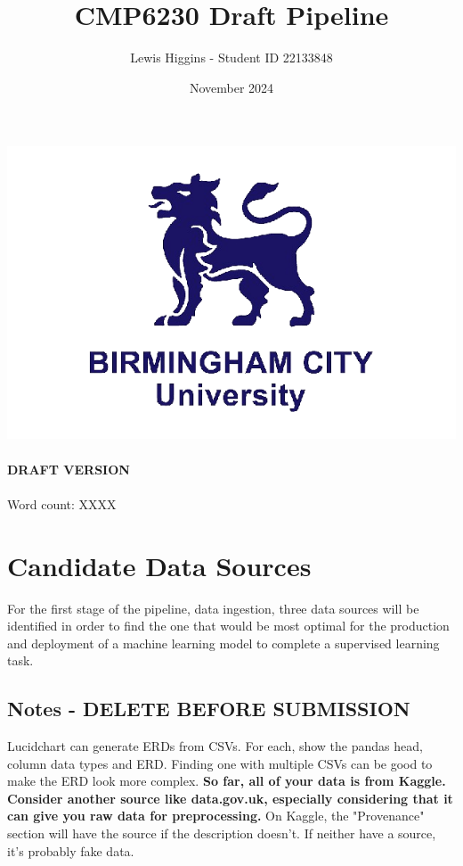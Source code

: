 \documentclass[12pt]{report}
\title{CMP6230 Draft Pipeline}
\author{Lewis Higgins - Student ID 22133848}
\date{November 2024}
\begin{document}
\makeatletter
\begin{titlepage}
    \begin{center}
        \includegraphics[width=0.7\linewidth]{BCU}\\[4ex]
        {\large \bfseries  \@title }\\[2ex]
        {\large \bfseries  DRAFT VERSION }\\[2ex]
        {\@author}\\[30ex]
        {Word count: XXXX}\\[20ex]
    \end{center}
\end{titlepage}
\makeatother
\thispagestyle{empty}
\newpage


\setcounter{page}{0}

\tableofcontents
\thispagestyle{empty}


\chapter{Candidate Data Sources}
For the first stage of the pipeline, data ingestion, three data sources will be identified in order to find 
the one that would be most optimal for the production and deployment of a machine learning model to complete 
a supervised learning task.

\section{Notes - DELETE BEFORE SUBMISSION}
Lucidchart can generate ERDs from CSVs.
For each, show the pandas head, column data types and ERD.
Finding one with multiple CSVs can be good to make the ERD look more complex. 
\textbf{So far, all of your data is from Kaggle. Consider another source like data.gov.uk, especially
considering that it can give you raw data for preprocessing.} On Kaggle, the "Provenance" section will 
have the source if the description doesn't. If neither have a source, it's probably fake data.
\end{document}
